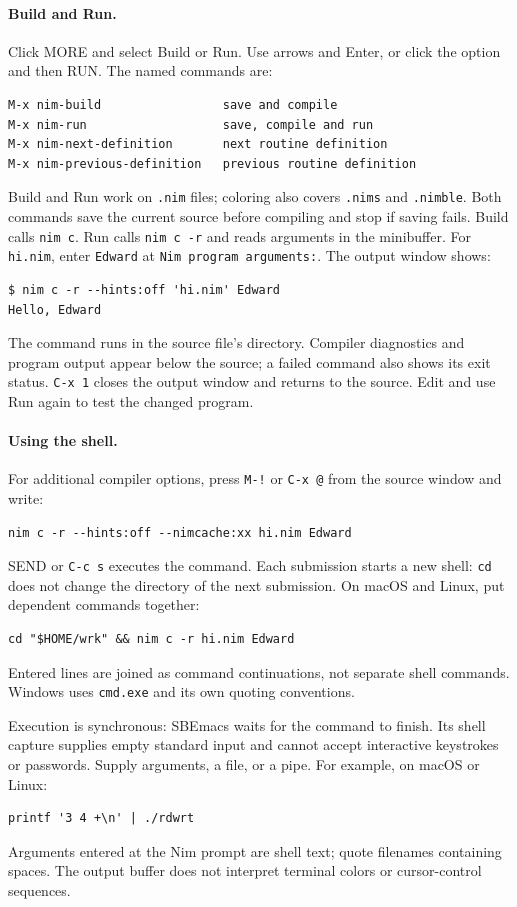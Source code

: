 \documentclass[a4paper,12pt,openany]{book}
\begin{document}
\paragraph{Build and Run.}
Click MORE and select Build or Run. Use arrows and Enter, or click the
option and then RUN. The named commands are:
\begin{verbatim}
M-x nim-build                 save and compile
M-x nim-run                   save, compile and run
M-x nim-next-definition       next routine definition
M-x nim-previous-definition   previous routine definition
\end{verbatim}
Build and Run work on \verb|.nim| files; coloring also covers
\verb|.nims| and \verb|.nimble|. Both commands save the current source
before compiling and stop if saving fails. Build calls \verb|nim c|.
Run calls \verb|nim c -r| and reads arguments in the minibuffer.
For \verb|hi.nim|, enter \verb|Edward| at
\verb|Nim program arguments:|. The output window shows:
\begin{verbatim}
$ nim c -r --hints:off 'hi.nim' Edward
Hello, Edward
\end{verbatim}
The command runs in the source file's directory. Compiler diagnostics
and program output appear below the source; a failed command also shows
its exit status. \verb|C-x 1| closes the output window and returns to
the source. Edit and use Run again to test the changed program.

\paragraph{Using the shell.}
For additional compiler options, press \verb|M-!| or \verb|C-x @|
from the source window and write:
\begin{verbatim}
nim c -r --hints:off --nimcache:xx hi.nim Edward
\end{verbatim}
SEND or \verb|C-c s| executes the command. Each submission starts a
new shell: \verb|cd| does not change the directory of the next
submission. On macOS and Linux, put dependent commands together:
\begin{verbatim}
cd "$HOME/wrk" && nim c -r hi.nim Edward
\end{verbatim}
Entered lines are joined as command continuations, not separate shell
commands. Windows uses \verb|cmd.exe| and its own quoting conventions.

Execution is synchronous: SBEmacs waits for the command to finish.
Its shell capture supplies empty standard input and cannot accept
interactive keystrokes or passwords. Supply arguments, a file, or a
pipe. For example, on macOS or Linux:
\begin{verbatim}
printf '3 4 +\n' | ./rdwrt
\end{verbatim}
Arguments entered at the Nim prompt are shell text; quote filenames
containing spaces. The output buffer does not interpret terminal colors
or cursor-control sequences.
\end{document}
